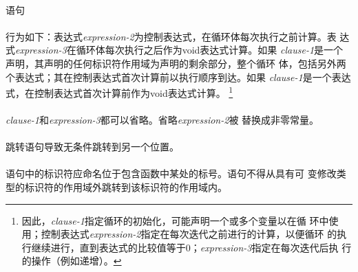 \paragraph{}
语句                                                                          \\
\mbox{\hspace{4em}  \tm{;}  \tm{;}
   \tm{)} }                                    \\
行为如下：表达式\textit{expression-2}为控制表达式，在循环体每次执行之前计算。表
达式\textit{expression-3}在循环体每次执行之后作为void表达式计算。如果
\textit{clause-1}是一个声明，其声明的任何标识符作用域为声明的剩余部分，整个循环
体，包括另外两个表达式；其在控制表达式首次计算前以执行顺序到达。如果
\textit{clause-1}是一个表达式，在控制表达式首次计算前作为void表达式计算。
\footnote{因此，\textit{clause-1}指定循环的初始化，可能声明一个或多个变量以在循
环中使用；控制表达式\textit{expression-2}指定在每次迭代之前进行的计算，以便循环
的执行继续进行，直到表达式的比较值等于0；\textit{expression-3}指定在每次迭代后执
行的操作（例如递增）。}

\paragraph{}
\textit{clause-1}和\textit{expression-3}都可以省略。省略\textit{expression-2}被
替换成非零常量。

\syntax
\paragraph{}

\semantic
\paragraph{}
跳转语句导致无条件跳转到另一个位置。

\constraint
\paragraph{}
语句中的标识符应命名位于包含函数中某处的标号。语句不得从具有可
变修改类型的标识符的作用域外跳转到该标识符的作用域内。

